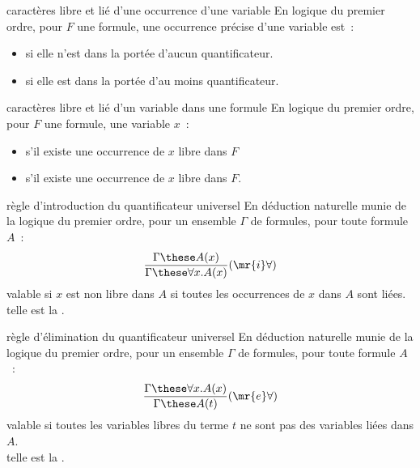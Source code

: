 \begin{adjustwidth}{-3cm}{-3cm}
\begin{definition}{7.24}{caractères libre et lié d'une occurrence d'une variable}
    En logique du premier ordre, pour $F$ une formule, une occurrence précise d'une variable est~:
    \begin{itemize}
        \item {} si elle n'est dans la portée d'aucun quantificateur.
        \item {} si elle est dans la portée d'au moins quantificateur.
    \end{itemize}
\end{definition}

\begin{definition}{7.25}{caractères libre et lié d'un variable dans une formule}
    En logique du premier ordre, pour $F$ une formule, une variable $x$~:
    \begin{itemize}
        \item {} s'il existe une occurrence de $x$ libre dans $F$
        \item {} s'il existe une occurrence de $x$ libre dans $F$.
    \end{itemize}
\end{definition}


\begin{definition}{7.26}{règle d'introduction du quantificateur universel}
    En déduction naturelle munie de la logique du premier ordre, pour un ensemble $\Gamma$ de formules, pour toute formule $A$~:
    $$\frac{\Gamma \these A(x)}{\Gamma \these \forall x.A(x)}(\mr{i}\forall)$$
    valable si $x$ est non libre dans $A$ \ie si toutes les occurrences de $x$ dans $A$ sont liées.\\
    telle est la .
\end{definition}

\begin{definition}{7.27}{règle d'élimination du quantificateur universel}
    En déduction naturelle munie de la logique du premier ordre, pour un ensemble $\Gamma$ de formules, pour toute formule $A$~:
    $$\frac{\Gamma \these \forall x.A(x)}{\Gamma \these A(t)}(\mr{e}\forall)$$
    valable si toutes les variables libres du terme $t$ ne sont pas des variables liées dans $A$.\\
    telle est la .
\end{definition}


\end{adjustwidth}
